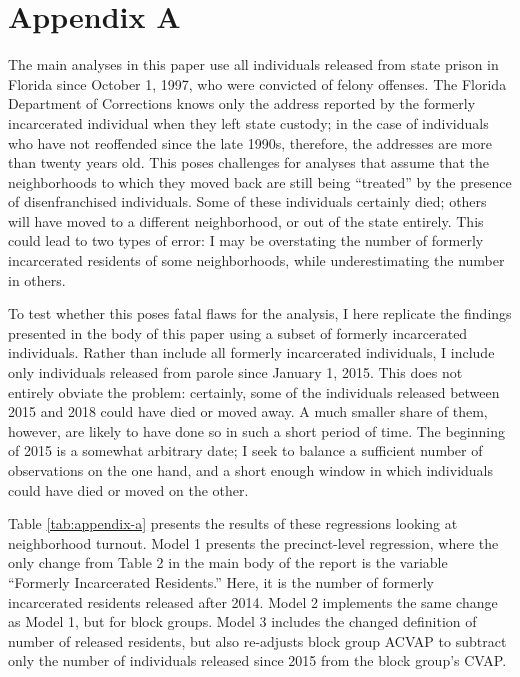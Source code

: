 \documentclass[
  12pt,
]{article}
\author{}
\date{\vspace{-2.5em}}
\begin{document}
\pagebreak

\setcounter{table}{0}  \renewcommand{\thetable}{A\arabic{table}} \setcounter{figure}{0} \renewcommand{\thefigure}{A\arabic{figure}}

\hypertarget{appendix-a}{%
\section*{Appendix A}\label{appendix-a}}

The main analyses in this paper use all individuals released from state prison in Florida since October 1, 1997, who were convicted of felony offenses. The Florida Department of Corrections knows only the address reported by the formerly incarcerated individual when they left state custody; in the case of individuals who have not reoffended since the late 1990s, therefore, the addresses are more than twenty years old. This poses challenges for analyses that assume that the neighborhoods to which they moved back are still being ``treated'' by the presence of disenfranchised individuals. Some of these individuals certainly died; others will have moved to a different neighborhood, or out of the state entirely. This could lead to two types of error: I may be overstating the number of formerly incarcerated residents of some neighborhoods, while underestimating the number in others.

To test whether this poses fatal flaws for the analysis, I here replicate the findings presented in the body of this paper using a subset of formerly incarcerated individuals. Rather than include all formerly incarcerated individuals, I include only individuals released from parole since January 1, 2015. This does not entirely obviate the problem: certainly, some of the individuals released between 2015 and 2018 could have died or moved away. A much smaller share of them, however, are likely to have done so in such a short period of time. The beginning of 2015 is a somewhat arbitrary date; I seek to balance a sufficient number of observations on the one hand, and a short enough window in which individuals could have died or moved on the other.

Table \ref{tab:appendix-a} presents the results of these regressions looking at neighborhood turnout. Model 1 presents the precinct-level regression, where the only change from Table 2 in the main body of the report is the variable ``Formerly Incarcerated Residents.'' Here, it is the number of formerly incarcerated residents released after 2014. Model 2 implements the same change as Model 1, but for block groups. Model 3 includes the changed definition of number of released residents, but also re-adjusts block group ACVAP to subtract only the number of individuals released since 2015 from the block group's CVAP.
\end{document}
